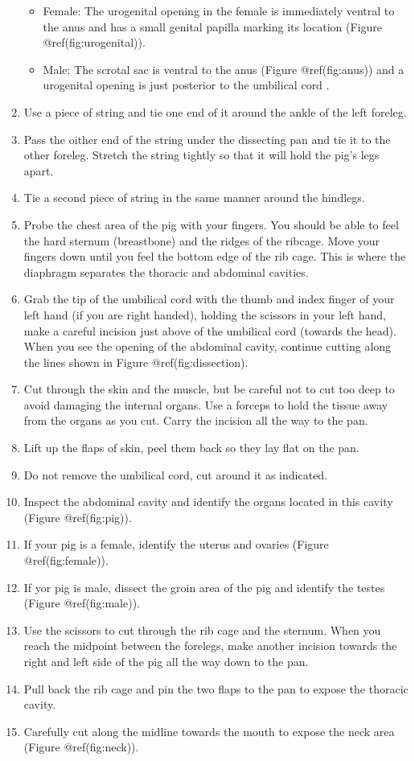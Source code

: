 \documentclass[]{article}
\providecommand{\tightlist}{%
  \setlength{\itemsep}{0pt}\setlength{\parskip}{0pt}}
\providecommand{\tightlist}{%
  \setlength{\itemsep}{0pt}\setlength{\parskip}{0pt}}
\theoremstyle{definition}
\theoremstyle{definition}
\theoremstyle{definition}
\theoremstyle{remark}
\begin{document}
\begin{enumerate}
  \begin{itemize}
  \tightlist
  \item
    Female: The urogenital opening in the female is immediately ventral to the anus and has a small genital papilla marking its location (Figure @ref(fig:urogenital)).
  \item
    Male: The scrotal sac is ventral to the anus (Figure @ref(fig:anus)) and a urogenital opening is just posterior to the umbilical cord .
  \end{itemize}
\item
  Use a piece of string and tie one end of it around the ankle of the left foreleg.
\item
  Pass the oither end of the string under the dissecting pan and tie it to the other foreleg. Stretch the string tightly so that it will hold the pig's legs apart.
\item
  Tie a second piece of string in the same manner around the hindlegs.
\item
  Probe the chest area of the pig with your fingers. You should be able to feel the hard sternum (breastbone) and the ridges of the ribcage. Move your fingers down until you feel the bottom edge of the rib cage. This is where the diaphragm separates the thoracic and abdominal cavities.
\item
  Grab the tip of the umbilical cord with the thumb and index finger of your left hand (if you are right handed), holding the scissors in your left hand, make a careful incision just above of the umbilical cord (towards the head). When you see the opening of the abdominal cavity, continue cutting along the lines shown in Figure @ref(fig:dissection).
\item
  Cut through the skin and the muscle, but be careful not to cut too deep to avoid damaging the internal organs. Use a forceps to hold the tissue away from the organs as you cut. Carry the incision all the way to the pan.
\item
  Lift up the flaps of skin, peel them back so they lay flat on the pan.
\item
  Do not remove the umbilical cord, cut around it as indicated.
\item
  Inspect the abdominal cavity and identify the organs located in this cavity (Figure @ref(fig:pig)).
\item
  If your pig is a female, identify the uterus and ovaries (Figure @ref(fig:female)).
\item
  If yor pig is male, dissect the groin area of the pig and identify the testes (Figure @ref(fig:male)).
\item
  Use the scissors to cut through the rib cage and the sternum. When you reach the midpoint between the forelegs, make another incision towards the right and left side of the pig all the way down to the pan.
\item
  Pull back the rib cage and pin the two flaps to the pan to expose the thoracic cavity.
\item
  Carefully cut along the midline towards the mouth to expose the neck area (Figure @ref(fig:neck)).
\end{enumerate}
\end{document}
